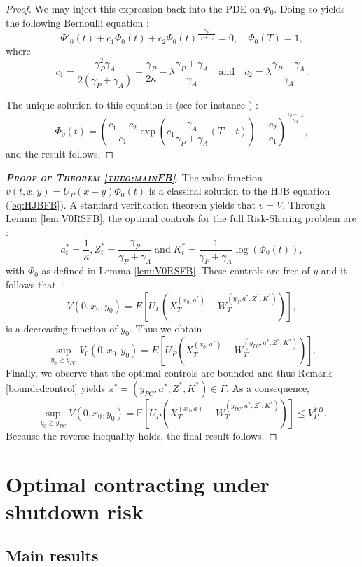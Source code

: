 \documentclass[numbook, envcountsect, envcountsame, envcountreset, runningheads, smallextended]{article}
\def \E{\mathbb{E}}
\begin{document}
\begin{proof}
We may inject this expression back into the PDE on $\Phi_0$. Doing so yields the following Bernoulli equation : 
$$ \Phi'_0(t) + c_1\Phi_0(t) + c_2 \Phi_0(t)^{\frac{\gamma_P}{\gamma_P+\gamma_A}}=0, \quad \Phi_0(T) = 1,$$
where 
$$ c_1 = \frac{\gamma_P^2 \gamma_A}{2(\gamma_P+\gamma_A) } - \frac{\gamma_P}{2\kappa} - \lambda \frac{\gamma_P + \gamma_A}{\gamma_A} \quad \text{and} \quad c_2 = \lambda \frac{\gamma_P + \gamma_A}{\gamma_A}.$$

The unique solution to this equation is (see for instance \cite{Zwillinger:97}) : 
$$\Phi_0(t) = \left(  \frac{c_1 + c_2}{c_1} \exp\left(c_1 \frac{\gamma_A}{\gamma_P + \gamma_A}(T-t)\right) - \frac{c_2}{c_1}\right)^{\frac{\gamma_P+\gamma_A}{\gamma_A}},$$
and the result follows. 
\end{proof}

\begin{proof}[\textbf{\scshape{Proof of Theorem \ref{theo:mainFB}}}]
The value function $v(t,x,y)=U_P(x-y) \Phi_0(t)$ is a classical solution to the HJB equation (\ref{eq:HJBFB}). A standard verification theorem yields  that $v=V$. 
Through Lemma \ref{lem:V0RSFB}, the optimal controls for the full Risk-Sharing problem are : 
$$a^*_t = \dfrac{1}{\kappa}, Z^*_t = \dfrac{\gamma_P}{\gamma_P + \gamma_A}\; \text{and} \; K^*_t = \dfrac{1}{\gamma_P + \gamma_A} \log(\Phi_0(t)),$$
with $\Phi_0$ as defined in Lemma \ref{lem:V0RSFB}. These controls are free of $y$ and it follows that~: 
$$V(0,x_0,y_0) = E\left[ U_P\left(X_T^{(x_0,a^*)} - W_T^{(y_0,a^*,Z^*,K^*)}\right)\right],$$
is a decreasing function of $y_0$. Thus we obtain 
$$\sup_{y_0\ge y_{PC}}V_0(0,x_0,y_0) = E\left[ U_P\left(X_T^{(x_0,a^*)} - W_T^{(y_{PC},a^*,Z^*,K^*)}\right)\right].$$
Finally, we observe that the optimal controls are bounded and thus Remark \eqref{boundedcontrol} yields $\pi^*=(y_{PC},a^*,Z^*,K^*) \in \Gamma$. As a consequence,
$$
\sup_{y_0\ge y_{PC}} V(0,x_0,y_0) =  \E\left[ U_P\left(X_T^{(x_0,a)} - W_T^{(y_{PC},a^*,Z^*,K^*)}\right)\right] \le V_P^{FB}.
$$
Because the reverse inequality holds, the final result follows. 
\end{proof}






\section{Optimal contracting under shutdown risk}
\label{sec:OC}

\subsection{Main results}
\end{document}
